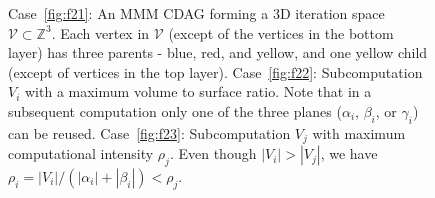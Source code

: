 \documentclass[sigplan,review,anonymous,10pt]{acmart}\settopmatter{printfolios=true,printccs=false,printacmref=false}
\begin{document}
\begin{figure}
	\centering
	\hfill
	\hfill
		\caption{
			Case~\ref{fig:f21}:
		An MMM CDAG forming a 3D 
		iteration 
		space $\mathcal{V} \subset \mathbb{Z}^3$.
		Each 
		vertex 
		in $\mathcal{V}$
		(except of the vertices in the bottom layer) has 
		three parents - blue, 
		red, 
		and yellow, and one yellow child (except of vertices 
		in the top layer). 
		Case~\ref{fig:f22}: 
		Subcomputation $V_i$ with a maximum volume to surface ratio. Note that 
		in 
		a subsequent computation only one of the three planes 
		($\alpha_i$, $\beta_i$, or $\gamma_i$) 
		can 
		be reused. 
		Case~\ref{fig:f23}: Subcomputation $V_j$ with maximum computational 
		intensity $\rho_j$. Even though 
		$|V_i| > |V_j|$, we have
		$\rho_i = |V_i|/(|\alpha_i| + |\beta_i|) < \rho_j$.
	}

\end{figure}
\end{document}
